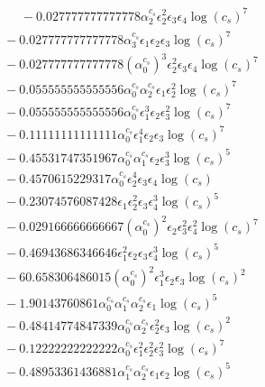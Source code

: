 \documentclass[10pt]{article}
\begin{document}
\begin{align*}
\phantom{F_{s,7}} &\phantom{={}}{}  - 0.027777777777778 \alpha_{2}^{c_s} \epsilon_{2}^{2} \epsilon_{3} \epsilon_{4} \log{\left(c_{s} \right)}^{7} \\
&{}  - 0.027777777777778 \alpha_{3}^{c_s} \epsilon_{1} \epsilon_{2} \epsilon_{3} \log{\left(c_{s} \right)}^{7} \\
&{}  - 0.027777777777778 \left(\alpha_{0}^{c_s}\right)^{3} \epsilon_{2}^{2} \epsilon_{3} \epsilon_{4} \log{\left(c_{s} \right)}^{7} \\
&{}  - 0.055555555555556 \alpha_{0}^{c_s} \alpha_{2}^{c_s} \epsilon_{1} \epsilon_{2}^{2} \log{\left(c_{s} \right)}^{7} \\
&{}  - 0.055555555555556 \alpha_{0}^{c_s} \epsilon_{1}^{3} \epsilon_{2} \epsilon_{3}^{2} \log{\left(c_{s} \right)}^{7} \\
&{}  - 0.11111111111111 \alpha_{0}^{c_s} \epsilon_{1}^{4} \epsilon_{2} \epsilon_{3} \log{\left(c_{s} \right)}^{7} \\
&{}  - 0.45531747351967 \alpha_{0}^{c_s} \alpha_{1}^{c_s} \epsilon_{2} \epsilon_{3}^{3} \log{\left(c_{s} \right)}^{5} \\
&{}  - 0.4570615229317 \alpha_{0}^{c_s} \epsilon_{2}^{4} \epsilon_{3} \epsilon_{4} \log{\left(c_{s} \right)} \\
&{}  - 0.23074576087428 \epsilon_{1} \epsilon_{2}^{2} \epsilon_{3} \epsilon_{4}^{3} \log{\left(c_{s} \right)}^{5} \\
&{}  - 0.029166666666667 \left(\alpha_{0}^{c_s}\right)^{2} \epsilon_{2} \epsilon_{3}^{2} \epsilon_{4}^{2} \log{\left(c_{s} \right)}^{7} \\
&{}  - 0.46943686346646 \epsilon_{1}^{2} \epsilon_{2} \epsilon_{3} \epsilon_{4}^{3} \log{\left(c_{s} \right)}^{5} \\
&{}  - 60.658306486015 \left(\alpha_{0}^{c_s}\right)^{2} \epsilon_{1}^{3} \epsilon_{2} \epsilon_{3} \log{\left(c_{s} \right)}^{2} \\
&{}  - 1.90143760861 \alpha_{0}^{c_s} \alpha_{1}^{c_s} \alpha_{2}^{c_s} \epsilon_{1} \log{\left(c_{s} \right)}^{5} \\
&{}  - 0.48414774847339 \alpha_{0}^{c_s} \alpha_{2}^{c_s} \epsilon_{2}^{2} \epsilon_{3} \log{\left(c_{s} \right)}^{2} \\
&{}  - 0.12222222222222 \alpha_{0}^{c_s} \epsilon_{1}^{2} \epsilon_{2}^{2} \epsilon_{3}^{2} \log{\left(c_{s} \right)}^{7} \\
&{}  - 0.48953361436881 \alpha_{1}^{c_s} \alpha_{2}^{c_s} \epsilon_{1} \epsilon_{2} \log{\left(c_{s} \right)}^{5} \\

\end{align*}
\end{document}
